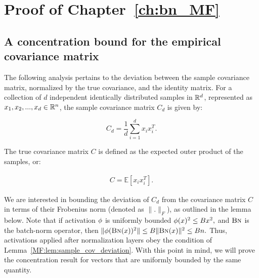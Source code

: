  
 
 
 
 
\chapter{Proof of Chapter~\ref{ch:bn_MF}}\label{ch:bn_MF:proofs}


\section{A concentration bound for the empirical covariance matrix}

The following analysis pertains to the deviation between the sample covariance matrix, normalized by the true covariance, and the identity matrix. For a collection of $d$ independent identically distributed \iid samples in $\mathbb{R}^d$, represented as $x_1, x_2, ..., x_d \in \mathbb{R}^n$, the sample covariance matrix $C_d$ is given by:

\begin{equation}
C_d = \frac{1}{d} \sum_{i=1}^{d} x_i x_i^T.
\end{equation}

The true covariance matrix $C$ is defined as the expected outer product of the samples, or:

\begin{align}
C = \mathbb{E}[x_i x_i^T].
\end{align}

We are interested in bounding the deviation of $ C_d$ from the covariance matrix $C$ in terms of their Frobenius norm (denoted as $\|.\|_{F}$), as outlined in the lemma below. Note that if activation $\phi$ is uniformly bounded $\phi(x)^2\le B x^2,$ and $\text{\sc{Bn}}$ is the batch-norm operator, then ${\|\phi(\text{\sc{Bn}}(x))^2\|\le B \|\text{\sc{Bn}}(x)\|^2 \le B n}.$ Thus, activations applied after normalization layers obey the condition of Lemma~\ref{MF:lem:sample_cov_deviation}. With this point in mind, we will prove the concentration result for vectors that are uniformly bounded by the same quantity.


